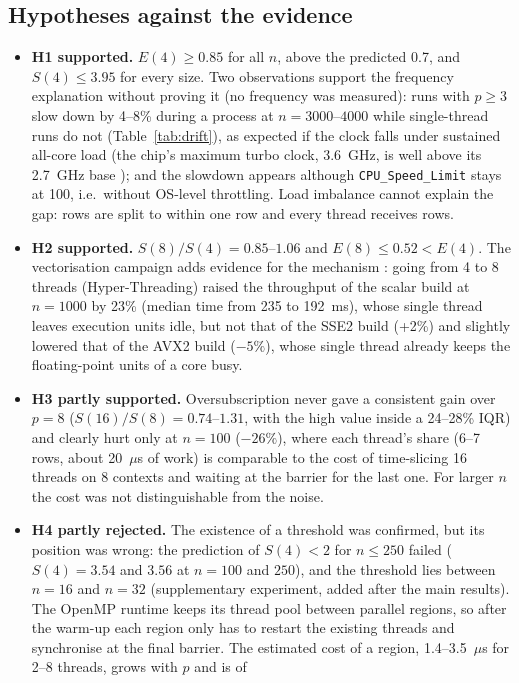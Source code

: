 \subsection{Hypotheses against the evidence}
\begin{itemize}
\item \textbf{H1 supported.} $E(4)\ge0.85$ for all $n$, above the predicted 0.7, and $S(4)\le3.95$ for every size. Two observations
support the frequency explanation without proving it (no frequency was measured): runs with $p\ge3$ slow down by 4--8\% during a process at
$n=3000$--$4000$ while single-thread runs do not (Table~\ref{tab:drift}), as expected if the clock falls under sustained all-core load (the chip's
maximum turbo clock, 3.6~GHz, is well above its 2.7~GHz base \cite{nbc}); and the slowdown appears although \texttt{CPU\_Speed\_Limit} stays at
100, i.e.\ without OS-level throttling. Load imbalance cannot explain
the gap: rows are split to within one row and every thread receives rows.
\item \textbf{H2 supported.} $S(8)/S(4)=0.85$--$1.06$ and $E(8)\le0.52<E(4)$. The vectorisation campaign adds evidence for the mechanism
\cite{marr}: going from 4 to 8 threads (Hyper-Threading) raised the throughput of the scalar build at $n=1000$ by 23\% (median time
from 235 to 192~ms), whose single thread leaves execution units idle, but not that of the SSE2 build (+2\%) and slightly lowered that of the AVX2 build ($-5\%$), whose single thread already keeps the
floating-point units of a core busy.
\item \textbf{H3 partly supported.} Oversubscription never gave a consistent gain over $p=8$ ($S(16)/S(8)=0.74$--$1.31$, with the high
value inside a 24--28\% IQR) and clearly hurt only at $n=100$ ($-26\%$), where each thread's share (6--7 rows, about 20~$\mu$s of work) is
comparable to the cost of time-slicing 16 threads on 8 contexts and waiting at the barrier for the last one. For larger $n$ the cost was
not distinguishable from the noise.
\item \textbf{H4 partly rejected.} The existence of a threshold was confirmed, but its position was wrong: the prediction of $S(4)<2$ for $n\le250$
failed ($S(4)=3.54$ and $3.56$ at $n=100$ and $250$), and the threshold lies between $n=16$ and $n=32$ (supplementary experiment, added after
the main results). The OpenMP runtime keeps its thread pool between parallel regions, so after the warm-up each region only has to restart the
existing threads and synchronise at the final barrier. The estimated cost of a region, 1.4--3.5~$\mu$s for 2--8 threads, grows with $p$ and is of

\end{itemize}
